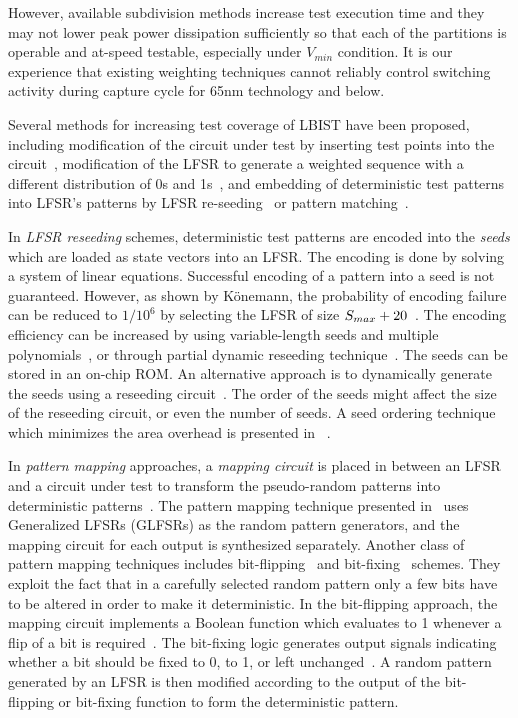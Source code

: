 \documentclass[conference]{IEEEtran}
\begin{document}
However, available subdivision methods increase test execution time and they may not lower peak power dissipation sufficiently so that each of the  partitions is operable and at-speed testable, especially under $V_{min}$ condition.
It is our experience that existing weighting techniques cannot reliably control switching activity during capture cycle for 65nm technology and below.

Several methods for increasing test coverage of LBIST have been proposed, including modification of the circuit under test by inserting test points into the circuit~\cite{EiL83,ToM96,TaR96}, modification of the LFSR to generate a weighted sequence with a different distribution of 0s and 1s~\cite{ChM84}, and
embedding of deterministic test patterns into LFSR's patterns by 
LFSR re-seeding~\cite{Ko91} or pattern matching~\cite{GuP88}.

In {\em LFSR reseeding} schemes, deterministic test patterns are encoded into the \emph{seeds} which are loaded as state vectors into an LFSR.
The encoding is done by solving a system of linear equations.
Successful encoding of a pattern into a seed is not guaranteed.
However, as shown by K{\"o}nemann, the probability of encoding failure can be reduced to $1/10^6$ 
by selecting the LFSR of size $S_{\textnormal\small{max}}+20$~\cite{Ko91}.
The encoding efficiency can be increased by using variable-length seeds and multiple polynomials~\cite{HeTRC92,RaTZ98}, or through partial dynamic reseeding technique~\cite{KrJT01}.
The seeds can be stored in an on-chip ROM. 
An alternative approach is to dynamically generate the seeds using a reseeding circuit~\cite{AlM03}.
The order of the seeds might affect the size of the reseeding circuit, or even the number of seeds.
A seed ordering technique which minimizes the area overhead is presented in~\cite{AlMM03} .

In {\em pattern mapping} approaches, a {\em mapping circuit} is placed in between an LFSR and a circuit under test to transform the pseudo-random patterns into deterministic patterns~\cite{Wu98}.
The pattern mapping technique presented in~\cite{ChP95} uses Generalized LFSRs (GLFSRs) as the random pattern generators, and the mapping circuit for each output is synthesized separately.
Another class of pattern mapping techniques includes bit-flipping~\cite{WuK96} and bit-fixing~\cite{ToM96_bitfix} schemes.
They exploit the fact that in a carefully selected random pattern  
only a few bits have to be altered in order to make it deterministic.
In the bit-flipping approach, the mapping circuit implements a Boolean function which evaluates to 1 whenever a flip of a bit is required~\cite{WuK96}.
The bit-fixing logic generates output signals indicating whether a bit should be fixed to 0, to 1, or left unchanged~\cite{ToM96_bitfix}.
A random pattern generated by an LFSR is then modified according to the output of the bit-flipping or bit-fixing function to form the deterministic pattern.
\end{document}
